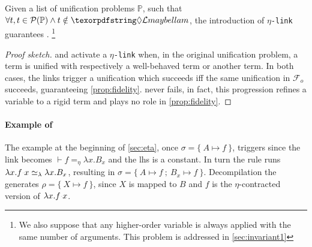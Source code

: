 \documentclass[sigconf,natbib=false,review]{acmart}
\newcommand{\appsep}{\ensuremath{\textcolor{lightgray}{\cdot}}}
\newcommand{\UnifRel}{\ensuremath{\simeq}}
\newcommand{\Ue}{\ensuremath{\UnifRel_\lambda}\xspace}
\newcommand{\linkMacro}[1]{\ensuremath{#1}\texttt{-link}\xspace}
\newcommand{\linketa} {\linkMacro{\eta}}
\newcommand{\Fo}{\texorpdfstring{\ensuremath{\mathcal{F}_{\!o}\xspace}}{Fo}} %
\newcommand{\linketaM}[3]{\ensuremath{#1 \vdash #2 =_\eta #3}}
\newcommand{\lhs}{lhs\xspace}
\newcommand{\foUnifPb}{\ensuremath{\mathbb{P}}\xspace}
\begin{document}
\begin{theorem}
  Given a list of unification problems \foUnifPb, such that 
  $\forall t, t\in\subterm{\foUnifPb} \land t \notin \notllambda$, 
  the introduction 
  of \linketa guarantees .
  \footnote{We also suppose that any higher-order variable is always applied with
  the same number of arguments. This problem is addressed in \cref{sec:invariant1}}
  \label{lemma:fidelity-maybeeta}
\end{theorem}

\begin{proof}[Proof sketch]
  \progressetaleft and \progressetadedup activate a \linketa when, in the
  original unification problem, a \maybeeta term is unified with respectively a
  well-behaved term or another \maybeeta term. In both cases, the links trigger
  a unification which succeeds iff the same unification in \Fo{} succeeds,
  guaranteeing \cref{prop:fidelity}. \progressetaright never fails, in fact,
  this progression refines a variable to a rigid term and plays no role in 
  \cref{prop:fidelity}.
\end{proof}

\paragraph{Example of \progressetaleft}

The example at the beginning of \cref{sec:eta}, once
$\sigma = \{~ A \mapsto f ~\}$, triggers \progressetaleft since the link
becomes \linketaM{}{f}{\lambda x.B_{x}} and the \lhs is a constant.
In turn the rule runs $\lambda x.f \appsep x \Ue{} \lambda x.B_{x}$,
resulting in $\sigma = \{~ A \mapsto f ~;~ B_{x} \mapsto f ~\}$.
Decompilation the generates $\rho = \{~ X \mapsto f ~\}$, since
$X$ is mapped to $B$ and
$f$ is the $\eta$-contracted version of $\lambda x.f \appsep x$.
\end{document}
